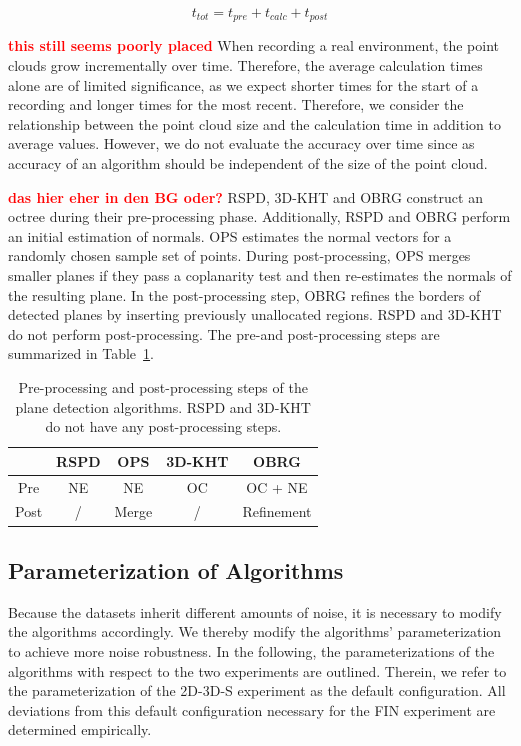 \documentclass[main.tex]{subfiles}
\begin{document}
\begin{equation}
    t_{tot} = t_{pre} + t_{calc} + t_{post}
\end{equation}

\textbf{\textcolor{red}{this still seems poorly placed}}
When recording a real environment, the point clouds grow incrementally over time.
Therefore, the average calculation times alone are of limited significance, as we expect shorter times for the start of a recording
and longer times for the most recent. Therefore, we consider the relationship between the point cloud size and the calculation time in
addition to average values. However, we do not evaluate the accuracy over time since as accuracy of an algorithm should be
independent of the size of the point cloud.


\textbf{\textcolor{red}{das hier eher in den BG oder?}}
RSPD, 3D-KHT and OBRG construct an octree during their pre-processing phase. Additionally, RSPD and OBRG perform an initial
estimation of normals. OPS estimates the normal vectors for a randomly chosen sample set of points.
During post-processing, OPS merges smaller planes if they pass a coplanarity test and then re-estimates the normals of the
resulting plane. In the post-processing step, OBRG refines the borders of detected planes by inserting
previously unallocated regions. RSPD and 3D-KHT do not perform post-processing.
The pre-and post-processing steps are summarized in Table~\ref{tab:pre-post}.


\begin{table}[H]
    \centering
    \begin{tabular}{c|cccc}
             & RSPD & OPS   & 3D-KHT & OBRG       \\ \hline
        Pre  & NE   & NE    & OC     & OC + NE    \\
        Post & /    & Merge & /      & Refinement
    \end{tabular}
    \caption{Pre-processing and post-processing steps of the plane detection algorithms. RSPD and 3D-KHT do not have any post-processing steps.}
    \label{tab:pre-post}
\end{table}

\subsection{Parameterization of Algorithms}
Because the datasets inherit different amounts of noise, it is necessary to modify the algorithms accordingly.
We thereby modify the algorithms' parameterization to achieve more noise robustness.
In the following, the parameterizations of the algorithms with respect to the two experiments are outlined.
Therein, we refer to the parameterization of the 2D-3D-S experiment as the default configuration.
All deviations from this default configuration necessary for the FIN experiment are determined empirically.
\end{document}
